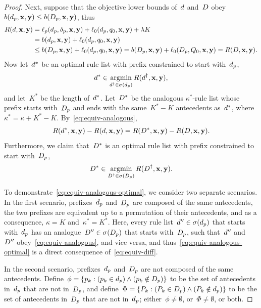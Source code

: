 \begin{proof}
Next, suppose that the objective lower bounds of~${d}$ and~${D}$
obey ${b(d_p, \mathbf{x}, \mathbf{y}) \le b(D_p, \mathbf{x}, \mathbf{y})}$, thus
\begin{align}
\Obj(\RL, \x, \y)
&= \Loss_p(\Prefix, \Labels, \x, \y) + \Loss_0(\Prefix, \Default, \x, \y) + \Reg K \nn \\
&= b(\Prefix, \x, \y) + \Loss_0(\Prefix, \Default, \x, \y) \nn \\
&\le b(\PrefixB, \x, \y) + \Loss_0(\Prefix, \Default, \x, \y)
= b(\PrefixB, \x, \y) + \Loss_0(\PrefixB, \DefaultB, \x, \y)
= \Obj(\RLB, \x, \y).
\label{eqref:equiv-ineq}
\end{align}
Now let~${d}^*$ be an optimal rule list with prefix
constrained to start with~$d_p$,
\begin{align}
\RL^* \in \argmin_{\RL^\dagger \in \StartsWith(\Prefix)} \Obj(\RL^\dagger, \x, \y),
\end{align}
and let~$K^*$ be the length of~${d}^*$.
%
Let~${D}^*$ be the analogous $\kappa^*$-rule list whose prefix starts
with~$D_p$ and ends with the same~${K^* - K}$ antecedents as~${d}^*$,
where~${\kappa^* = \kappa + K^* - K}$.
%
By~\eqref{eq:equiv-analogous},
\begin{align}
\Obj(\RL^*, \x, \y) - \Obj(\RL, \x, \y)
= \Obj(\RLB^*, \x, \y) - \Obj(\RLB, \x, \y).
\label{eq:equiv-diff}
\end{align}
Furthermore, we claim that~${D}^*$ is an optimal rule list
with prefix constrained to start with~$D_p$,
\begin{align}
\RLB^* \in \argmin_{\RLB^\dagger \in \StartsWith(\PrefixB)} \Obj(\RLB^\dagger, \x, \y).
\label{eq:equiv-analogous-optimal}
\end{align}

To demonstrate~\eqref{eq:equiv-analogous-optimal},
we consider two separate scenarios.
%
In the first scenario, prefixes~$d_p$ and~$D_p$
are composed of the same antecedents,
\ie the two prefixes are equivalent up to a permutation of
their antecedents, and as a consequence,
${\kappa = K}$ and~${\kappa^* = K^*}$.
%
Here, every rule list~${{d}'' \in \sigma(d_p)}$
that starts with~$d_p$
has an analogue~${{D}'' \in \sigma(D_p)}$
that starts with~$D_p$,
such that~${d}''$ and~${D}''$ obey~\eqref{eq:equiv-analogous},
and vice versa, and thus~\eqref{eq:equiv-analogous-optimal}
is a direct consequence of~\eqref{eq:equiv-diff}.

In the second scenario, prefixes~$d_p$ and~$D_p$
are not composed of the same antecedents.
%
Define~${\phi = \{p_k : (p_k \in d_p) \wedge (p_k \notin D_p)\}}$
to be the set of antecedents in~$d_p$ that are not in~$D_p$,
and define~${\Phi = \{P_k : (P_k \in D_p) \wedge (P_k \notin d_p)\}}$
to be the set of antecedents in~$D_p$ that are not in~$d_p$;
either~${\phi \neq \emptyset}$, or~${\Phi \neq \emptyset}$, or both.


\end{proof}
